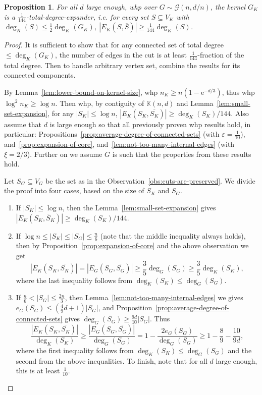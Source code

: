 \documentclass[11pt]{article}
\theoremstyle{plain}
\newtheorem{proposition}[theorem]{Proposition}
\let\epsilon=\varepsilon
\newcommand{\G}{\mathcal{G}}
\newcommand{\emm}{\mathrm{e}}
\newcommand{\1}{\mathbb{1}}
\newcommand{\Kb}{\mathbb{K}}
\begin{document}
\begin{proposition}\label{prop:expansion-of-kernel}
    For all \(d\) large enough, whp over \(G\sim\G(n,d/n)\), the kernel \(G_K\) is a \emph{\(\tfrac{1}{144}\)-total-degree-expander}, i.e. for \emph{every} set \(S\subseteq V_K\) with \(\deg_K(S) \leq \tfrac 12 \deg_K(G_K)\), \(|E_K(S,\overline S)|\geq \tfrac{1}{144} \deg_K(S)\). 
\end{proposition}
\begin{proof}
    It is sufficient to show that for any connected set of total degree \(\leq \deg_K(G_K)\), the number of edges in the cut is at least \(\tfrac{1}{144}\)-fraction of the total degree. Then to handle arbitrary vertex set, combine the results for its connected components.
    
    By Lemma~\ref{lem:lower-bound-on-kernel-size}, whp \(n_K \geq n(1-\emm^{-d/3})\), thus whp \(\log^2 n_K \geq \log n\). Then whp, by contiguity of \(\Kb(n,d)\) and Lemma~\ref{lem:small-set-expansion}, for any \(|S_K|\leq \log n\), \(|E_K(S_K,\overline{S_K})|\geq\deg_K(S_K)/144\).
    Also assume that \(d\) is large enough so that all previously proven whp results hold, in particular:
    Propositions~\ref{prop:average-degree-of-connected-sets} (with \(\epsilon = \tfrac{1}{10}\)), and~\ref{prop:expansion-of-core}, and~\ref{lem:not-too-many-internal-edges} (with \(\xi = 2/3\)). 
    Further on we assume \(G\) is such that the properties from these results hold. 

    Let \(S_G\subseteq V_G\) be the set as in the Observation~\ref{obs:cuts-are-preserved}. 
    We divide the proof into four cases, based on the size of \(S_K\) and \(S_G\).
    \begin{enumerate}
        \item If \(|S_K|\leq \log n\), then the Lemma~\ref{lem:small-set-expansion} gives \(|E_K(S_K,\overline S_K)|\geq \deg_K(S_K) / 144\).
        
        \item If \(\log n\leq |S_K| \leq |S_G| \leq \tfrac n6\) (note that the middle inequality always holds), then by Proposition~\ref{prop:expansion-of-core} and the above observation we get
        \[
            |E_K(S_K,\overline{S_K})| = |E_G(S_G,\overline{S_G})| \geq \frac{3}{5} \deg_G(S_G) \geq \frac{3}{5}\deg_K(S_K),
        \]
        where the last inequality follows from \(\deg_K(S_K) \leq \deg_G(S_G)\).

        \item If \(\tfrac n6 < |S_G| \leq \tfrac{2n}{3}\), then Lemma~\ref{lem:not-too-many-internal-edges} we gives \(e_G(S_G) \leq (\tfrac 49d + 1)|S_G|\), and Proposition~\ref{prop:average-degree-of-connected-sets} gives \(\deg_G(S_G)\geq \tfrac{9d}{10}|S_G|\). Thus
        \[
        \frac{|E_K(S_K,\overline{S_K})|}{\deg_K(S_K)}\geq \frac{|E_G(S_G,\overline{S_G})|}{\deg_G(S_G)} = 1 - \frac{2e_G(S_G)}{\deg_G(S_G)} \geq 1 - \frac{8}{9} - \frac{10}{9d},
        \]
        where the first inequality follows from \(\deg_K(S_K)\leq\deg_G(S_G)\) and the second from the above inequalities. To finish, note that for all \(d\) large enough, this is at least \(\tfrac{1}{10}\).


\end{enumerate}
\end{proof}
\end{document}
